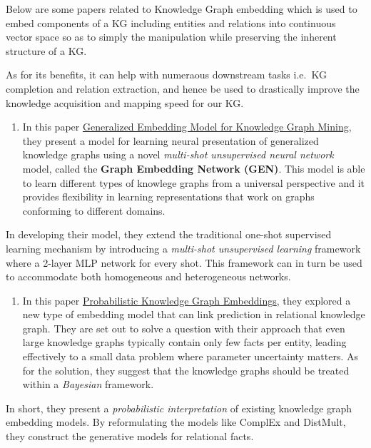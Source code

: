 \documentclass{acm_proc_article-sp}
\providecommand{\tightlist}{%
  \setlength{\itemsep}{0pt}\setlength{\parskip}{0pt}}
\begin{document}
Below are some papers related to Knowledge Graph embedding which is used
to embed components of a KG including entities and relations into
continuous vector space so as to simply the manipulation while
preserving the inherent structure of a KG.

As for its benefits, it can help with numeraous downstream tasks i.e.~KG
completion and relation extraction, and hence be used to drastically
improve the knowledge acquisition and mapping speed for our KG.

\begin{enumerate}
\def\labelenumi{\arabic{enumi}.}
\setcounter{enumi}{1}
\tightlist
\item
  In this paper
  \href{http://www.mlgworkshop.org/2018/papers/MLG2018_paper_5.pdf}{Generalized
  Embedding Model for Knowledge Graph Mining}, they present a model for
  learning neural presentation of generalized knowledge graphs using a
  novel \emph{multi-shot unsupervised neural network} model, called the
  \textbf{Graph Embedding Network (GEN)}. This model is able to learn
  different types of knowlege graphs from a universal perspective and it
  provides flexibility in learning representations that work on graphs
  conforming to different domains.
\end{enumerate}

In developing their model, they extend the traditional one-shot
supervised learning mechanism by introducing a \emph{multi-shot
unsupervised learning} framework where a 2-layer MLP network for every
shot. This framework can in turn be used to accommodate both homogeneous
and heterogeneous networks.

\begin{enumerate}
\def\labelenumi{\arabic{enumi}.}
\setcounter{enumi}{2}
\tightlist
\item
  In this paper
  \href{https://openreview.net/pdf?id=rJ4qXnCqFX}{Probabilistic
  Knowledge Graph Embeddings}, they explored a new type of embedding
  model that can link prediction in relational knowledge graph. They are
  set out to solve a question with their approach that even large
  knowledge graphs typically contain only few facts per entity, leading
  effectively to a small data problem where parameter uncertainty
  matters. As for the solution, they suggest that the knowledge graphs
  should be treated within a \emph{Bayesian} framework.
\end{enumerate}

In short, they present a \emph{probabilistic interpretation} of existing
knowledge graph embedding models. By reformulating the models like
ComplEx and DistMult, they construct the generative models for
relational facts.
\end{document}
